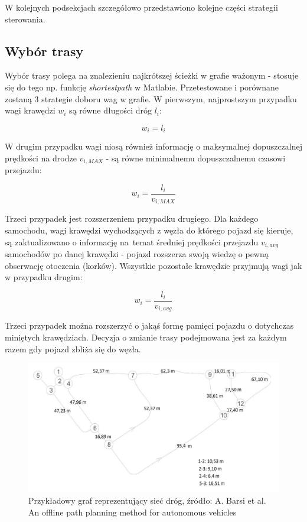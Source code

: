 \noindent W kolejnych podsekcjach szczegółowo przedstawiono kolejne części strategii sterowania.

\subsection{Wybór trasy}

Wybór trasy polega na znalezieniu najkrótszej ścieżki w grafie ważonym - stosuje się do tego np. funkcję \textit{shortestpath} w Matlabie. Przetestowane i porównane zostaną 3 strategie doboru wag w grafie. W pierwszym, najprostszym przypadku wagi krawędzi $w_i$ są równe długości dróg $l_i$:

\begin{equation}
w_i = l_i
\end{equation}

W drugim przypadku wagi niosą również informację o maksymalnej dopuszczalnej prędkości na drodze $v_{i,MAX}$ - są równe minimalnemu dopuszczalnemu czasowi przejazdu:

\begin{equation}
w_i = \frac{l_i}{v_{i,MAX}}
\end{equation}

Trzeci przypadek jest rozszerzeniem przypadku drugiego. Dla każdego samochodu, wagi krawędzi wychodzących z węzła do którego pojazd się kieruje, są zaktualizowano o informację na~temat średniej prędkości przejazdu $v_{i,avg}$ samochodów po danej krawędzi - pojazd rozszerza swoją wiedzę o pewną obserwację otoczenia (korków). Wszystkie pozostałe krawędzie przyjmują wagi jak w przypadku drugim:

\begin{equation}
w_i = \frac{l_i}{v_{i,avg}}
\end{equation}

Trzeci przypadek można rozszerzyć o jakąś formę pamięci pojazdu o dotychczas miniętych krawędziach. Decyzja o zmianie trasy podejmowana jest za każdym razem gdy pojazd zbliża się do węzła.

\begin{figure}[!h]
\centering
	\centering
	\includegraphics[width=.8\linewidth]{graf.jpg}
	\caption{Przykładowy graf reprezentujący sieć dróg, źródło: A. Barsi et al. An offline path planning method for autonomous vehicles}
	\label{fig:graf}
\end{figure}

